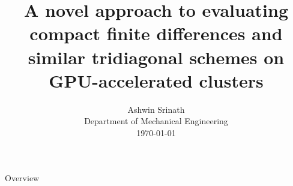 \documentclass[10pt]{beamer}
\begin{document}
\title[Compact finite differences on GPUs]
{A novel approach to evaluating 
compact finite differences 
and similar tridiagonal schemes on GPU-accelerated clusters}

\author[Ashwin Srinath]{
        Ashwin Srinath\\
        Department of Mechanical Engineering\\
        \today}
\date{}
\titlepage

\begin{frame}{Overview}
    \tableofcontents
\end{frame}






\end{document}
